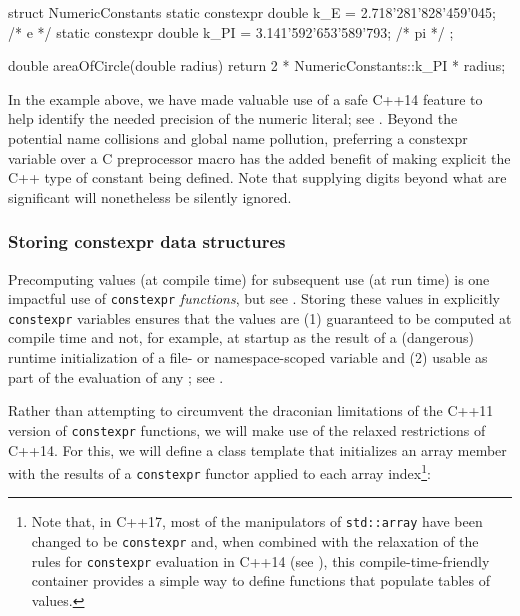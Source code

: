 \begin{emcppslisting}[emcppsstandards={c++14}]
struct NumericConstants
{
    static constexpr double k_E  = 2.718'281'828'459'045;  /* e */
    static constexpr double k_PI = 3.141'592'653'589'793;  /* pi */
};

double areaOfCircle(double radius)
{
    return 2 * NumericConstants::k_PI * radius;
}
\end{emcppslisting}
    
\noindent In the example above, we have made valuable use of a safe C++14
feature to help identify the needed precision of the numeric literal;
see . Beyond the potential name
collisions and global name pollution, preferring a constexpr variable
over a C preprocessor macro has the added benefit of making explicit the
C++ type of constant being defined. Note that supplying digits beyond
what are significant will nonetheless be silently ignored.

\subsubsection[Storing \lstinline!constexpr! data structures]{Storing {\SubsubsecCode constexpr} data structures}\label{storing-constexpr-data-structures}

Precomputing values (at compile time) for subsequent use (at run time)
is one impactful use of \lstinline!constexpr! \emph{functions}, but see . Storing these values in explicitly
\lstinline!constexpr! variables ensures that the values are (1) guaranteed
to be computed at compile time and not, for example, at startup as the
result of a (dangerous) runtime initialization of a file- or
namespace-scoped variable and (2) usable as part of the evaluation of
any ; see .

Rather than attempting to circumvent the draconian limitations of the
C++11 version of \lstinline!constexpr! functions, we will make use of the
relaxed restrictions of C++14. For this, we will define a class template
that initializes an array member with the results of a
\lstinline!constexpr! functor applied to each array
index{\cprotect\footnote{Note that, in C++17, most of the manipulators
of \lstinline!std::array! have been changed to be \lstinline!constexpr! and,
when combined with the relaxation of the rules for \lstinline!constexpr!
evaluation in C++14 (see ), this compile-time-friendly container provides a simple way to
  define functions that populate tables of values.}}:


